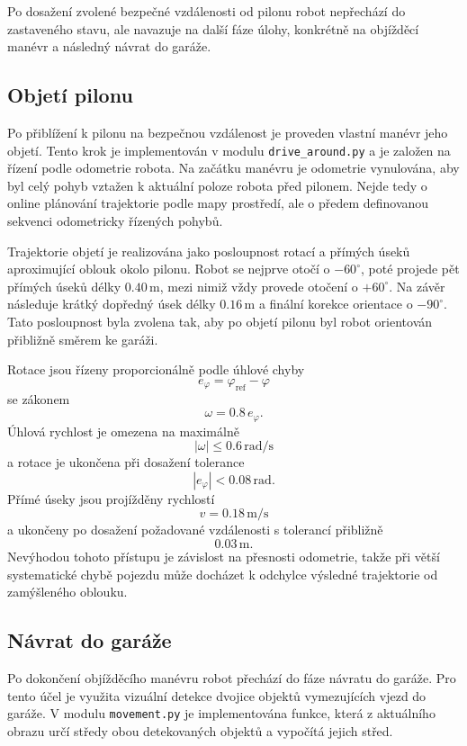 \documentclass[a4paper,11pt]{article}
\begin{document}
Po dosažení zvolené bezpečné vzdálenosti od pilonu robot nepřechází do zastaveného stavu, ale navazuje na další fáze úlohy, konkrétně na objížděcí manévr a následný návrat do garáže.

\subsection{Objetí pilonu}
Po přiblížení k pilonu na bezpečnou vzdálenost je proveden vlastní manévr jeho objetí. Tento krok je implementován v modulu \texttt{drive\_around.py} a je založen na řízení podle odometrie robota. Na začátku manévru je odometrie vynulována, aby byl celý pohyb vztažen k aktuální poloze robota před pilonem. Nejde tedy o online plánování trajektorie podle mapy prostředí, ale o předem definovanou sekvenci odometricky řízených pohybů.

Trajektorie objetí je realizována jako posloupnost rotací a přímých úseků aproximující oblouk okolo pilonu. Robot se nejprve otočí o $-60^\circ$, poté projede pět přímých úseků délky $0.40\,\mathrm{m}$, mezi nimiž vždy provede otočení o $+60^\circ$. Na závěr následuje krátký dopředný úsek délky $0.16\,\mathrm{m}$ a finální korekce orientace o $-90^\circ$. Tato posloupnost byla zvolena tak, aby po objetí pilonu byl robot orientován přibližně směrem ke garáži.

Rotace jsou řízeny proporcionálně podle úhlové chyby
\[
e_\varphi = \varphi_{\mathrm{ref}} - \varphi
\]
se zákonem
\begin{equation}
  \omega = 0.8\,e_\varphi.
\end{equation}
Úhlová rychlost je omezena na maximálně
\[
|\omega| \leq 0.6\,\mathrm{rad/s}
\]
a rotace je ukončena při dosažení tolerance
\[
|e_\varphi| < 0.08\,\mathrm{rad}.
\]
Přímé úseky jsou projížděny rychlostí
\[
v = 0.18\,\mathrm{m/s}
\]
a ukončeny po dosažení požadované vzdálenosti s tolerancí přibližně
\[
0.03\,\mathrm{m}.
\]
Nevýhodou tohoto přístupu je závislost na přesnosti odometrie, takže při větší systematické chybě pojezdu může docházet k odchylce výsledné trajektorie od zamýšleného oblouku.

\subsection{Návrat do garáže}
Po dokončení objížděcího manévru robot přechází do fáze návratu do garáže. Pro tento účel je využita vizuální detekce dvojice objektů vymezujících vjezd do garáže. V modulu \texttt{movement.py} je implementována funkce, která z aktuálního obrazu určí středy obou detekovaných objektů a vypočítá jejich střed.
\end{document}
